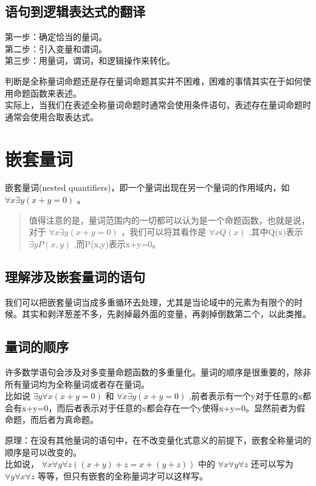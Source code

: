 \documentclass[12pt,a4paper,oneside]{ctexart}
\begin{document}
\subsection*{语句到逻辑表达式的翻译}

第一步：确定恰当的量词。\\
第二步：引入变量和谓词。\\
第三步：用量词，谓词，和逻辑操作来转化。

判断是全称量词命题还是存在量词命题其实并不困难，困难的事情其实在于如何使用命题函数来表述。\\
实际上，当我们在表述全称量词命题时通常会使用条件语句，表述存在量词命题时通常会使用合取表达式。

\section*{嵌套量词}

嵌套量词(nested quantifiers)，即一个量词出现在另一个量词的作用域内，如 \(\forall x\exists y(x+y=0)\) 。

\begin{quote}
值得注意的是，量词范围内的一切都可以认为是一个命题函数，也就是说，对于 \(\forall x\exists y(x+y=0)\) ，我们可以将其看作是 \(\forall xQ(x)\) ,其中Q(x)表示 \(\exists yP(x,y)\) ,而P(x,y)表示x+y=0。
\end{quote}

\subsection*{理解涉及嵌套量词的语句}

我们可以把嵌套量词当成多重循环去处理，尤其是当论域中的元素为有限个的时候。其实和剥洋葱差不多，先剥掉最外面的变量，再剥掉倒数第二个，以此类推。

\subsection*{量词的顺序}

许多数学语句会涉及对多变量命题函数的多重量化。量词的顺序是很重要的，除非所有量词均为全称量词或者存在量词。\\
比如说 \(\exists y\forall x(x+y=0)\) 和 \(\forall x\exists y(x+y=0)\) ,前者表示有一个y对于任意的x都会有x+y=0，而后者表示对于任意的x都会存在一个y使得x+y=0。显然前者为假命题，而后者为真命题。

原理：在没有其他量词的语句中，在不改变量化式意义的前提下，嵌套全称量词的顺序是可以改变的。\\
比如说， \(\forall x\forall y\forall z((x+y)+z=x+(y+z))\) 中的 \(\forall x\forall y\forall z\) 还可以写为 \(\forall y\forall x\forall z\) 等等，但只有嵌套的全称量词才可以这样写。
\end{document}

